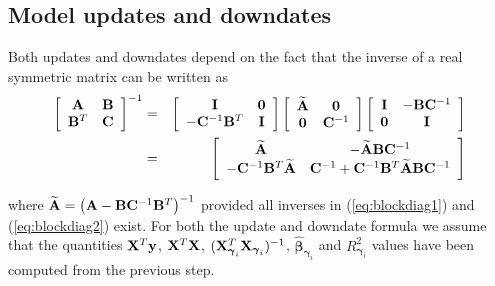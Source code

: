 \documentclass[12pt]{article}
\def\vectorfontone{\bf}
\def\vectorfonttwo{\boldsymbol}
\def\vy{{\vectorfontone y}}                      %
\def\vzero{{\vectorfontone 0}}
\def\vbeta{{\vectorfonttwo \beta}}               %
\def\vgamma{{\vectorfonttwo \gamma}}             %
\def\matrixfontone{\bf}
\def\mA{{\matrixfontone A}}                      %
\def\mB{{\matrixfontone B}}                      %
\def\mC{{\matrixfontone C}}                      %
\def\mI{{\matrixfontone I}}                      %
\def\mX{{\matrixfontone X}}                      %
\def\ds{\displaystyle}
\begin{document}
\subsection{Model updates and downdates} 

Both updates and downdates depend on the fact that
the inverse of a real symmetric matrix can be written as
\begin{eqnarray}
	\ds \left[ \begin{array}{cc}
		\mA   & \mB \\
		\mB^T & \mC
	\end{array} \right]^{-1}
	&  = &
	\ds \left[ \begin{array}{cc}
		\mI & \vzero \\
		-\mC^{-1}\mB^T &  \mI
	\end{array} \right]
	\left[ \begin{array}{cc}
		\widetilde{\mA} & \vzero \\
		\vzero & \mC^{-1}
	\end{array} \right]
	\left[ \begin{array}{cc}
		\mI    & -\mB\mC^{-1}\\
		\vzero & \mI
	\end{array} \right] \label{eq:blockdiag1}\\
	&  = &
	\ds\left[
	\begin{array}{cc}
		\widetilde{\mA}
		& - \widetilde{\mA}\mB\mC^{-1} \\
		-\mC^{-1}\mB^T\widetilde{\mA}
		& \mC^{-1} + \mC^{-1}\mB^T\widetilde{\mA}\mB\mC^{-1}
	\end{array}\right]\label{eq:blockdiag2}
\end{eqnarray}

\noindent where $\widetilde{\mA} = \left(\mA-\mB\mC^{-1}\mB^T\right)^{-1}$
provided all inverses in (\ref{eq:blockdiag1}) and
(\ref{eq:blockdiag2}) exist. 
For both the update and downdate formula we assume that the quantities
$\mX^T\vy$, $\mX^T\mX$, $(\mX_{\vgamma_i}^T\mX_{\vgamma_i})^{-1}$, 
$\widehat{\vbeta}_{\vgamma_i}$ and $R_{\vgamma_i}^2$ values have been computed from the previous step.
\end{document}
